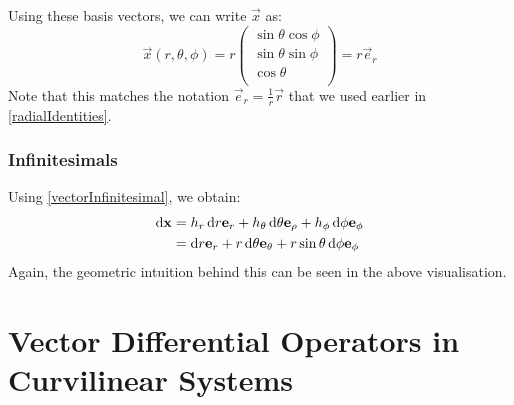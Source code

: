 \documentclass[../main.tex]{subfiles}
\begin{document}
Using these basis vectors, we can write $\vec{x}$ as:
\[
  \vec{x}(r, \theta, \phi) = r\begin{pmatrix}
  \sin \theta \cos \phi \\
  \sin \theta \sin \phi \\
  \cos \theta \\
  \end{pmatrix} = r \vec{e}_r
\]
Note that this matches the notation $\vec{e}_r = \frac{1}{r}\vec{r}$ that we used earlier in \cref{radialIdentities}.
\subsubsection{Infinitesimals}
Using \cref{vectorInfinitesimal}, we obtain:
\begin{align*}
  \d{\vec{x}} &= h_r \d{r} \vec{e}_r + h_\theta \d{\theta} \vec{e}_\rho + h_\phi \d{\phi} \vec{e}_\phi \\
              &= \d{r} \vec{e}_r + r \d{\theta} \vec{e}_\theta + r \sin \theta \d{\phi} \vec{e}_\phi
\end{align*}
Again, the geometric intuition behind this can be seen in the above visualisation.
\section{Vector Differential Operators in Curvilinear Systems}
\end{document}
